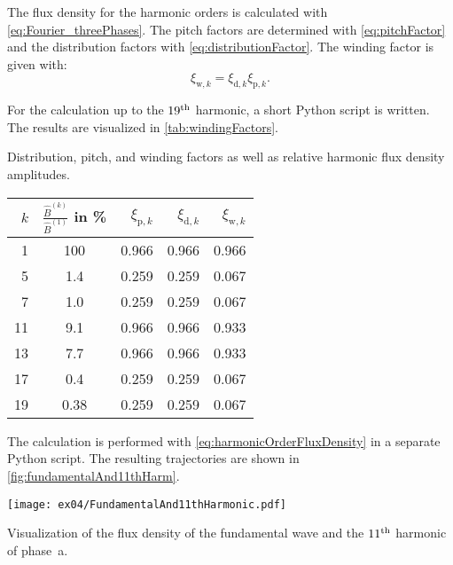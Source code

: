 \begin{solutionblock}
    The flux density for the harmonic orders is calculated with \eqref{eq:Fourier_threePhases}. The pitch factors are determined with \eqref{eq:pitchFactor} and the distribution factors with \eqref{eq:distributionFactor}. The winding factor is given with:
    \begin{equation}
        \xi_{\mathrm{w,}k} = \xi_{\mathrm{d,}k} \xi_{\mathrm{p,}k}.
    \end{equation}

    For the calculation up to the $19\textsuperscript{th}$ harmonic, a short Python script is written.
    The results are visualized in \autoref{tab:windingFactors}.
    \begin{solutiontable}[h]
        \caption{Distribution, pitch, and winding factors as well as relative harmonic flux density  amplitudes.}
        \centering
        \begin{tabular}{rcrrr}\toprule
        $k$ & $\frac{\hat{B}^{(k)}}{\hat{B}^{(1)}}$ in \%   & $\xi_{\mathrm{p,}k}$  & $\xi_{\mathrm{d,}k}$ & $\xi_{\mathrm{w,}k}$\\
        \midrule
        1   & 100   & 0.966 & 0.966 & 0.966 \\
        5   & 1.4   & 0.259 & 0.259 & 0.067 \\
        7   & 1.0   & 0.259 & 0.259 & 0.067 \\
        11  & 9.1   & 0.966 & 0.966 & 0.933 \\
        13  & 7.7   & 0.966 & 0.966 & 0.933 \\
        17  & 0.4   & 0.259 & 0.259 & 0.067 \\
        19  & 0.38  & 0.259 & 0.259 & 0.067 \\
        \bottomrule
        \end{tabular}
        \label{tab:windingFactors}
    \end{solutiontable}

\end{solutionblock}


\begin{solutionblock}
    The calculation is performed with \eqref{eq:harmonicOrderFluxDensity} in a separate Python script. The resulting trajectories are shown in \autoref{fig:fundamentalAnd11thHarm}.
    \begin{solutionfigure}[h]
        \centering
        \texttt{[image: ex04/FundamentalAnd11thHarmonic.pdf]}
        \caption{Visualization of the flux density of the fundamental wave and the $11\textsuperscript{th}$ harmonic of phase~a.}
        \label{fig:fundamentalAnd11thHarm}
    \end{solutionfigure}    

\end{solutionblock}




